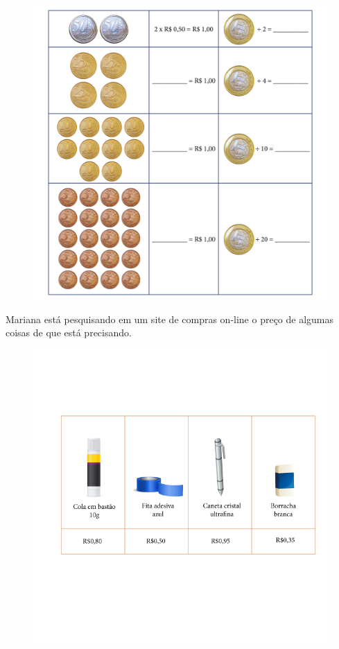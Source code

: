 \begin{figure}[htpb!]
\includegraphics[width=\textwidth]{../ilustracoes/MAT5/SAEB_5ANO_MAT_figura53.png}
\end{figure}


Mariana está pesquisando em um site de compras on-line o preço de
algumas coisas de que está precisando.

\begin{figure}[htpb!]
\includegraphics[width=\textwidth]{../ilustracoes/MAT5/SAEB_5ANO_MAT_figura54.png}
\end{figure}

